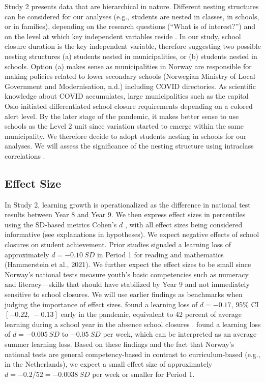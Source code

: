 Study 2 presents data that are hierarchical in nature. Different nesting structures can be considered for our analyses (e.g., students are nested in classes, in schools, or in families), depending on the research questions (``What is of interest?'') and on the level at which key independent variables reside \parencite{scott:2013}. In our study, school closure duration is the key independent variable, therefore suggesting two possible nesting structures (a) students nested in municipalities, or (b) students nested in schools. Option (a) makes sense as municipalities in Norway are responsible for making policies related to lower secondary schools (Norwegian Ministry of Local Government and Modernisation, n.d.) including COVID directories. As scientific knowledge about COVID accumulates, large municipalities such as the capital Oslo initiated differentiated school closure requirements depending on a colored alert level. By the later stage of the pandemic, it makes better sense to use schools as the Level 2 unit since variation started to emerge within the same municipality. We therefore decide to adopt students nesting in schools for our analyses. We will assess the significance of the nesting structure using intraclass correlations \parencite[$\text{ICC}_1$, ][]{ludtke:2009}.

\subsection{Effect Size}%

In Study 2, learning growth is operationalized as the difference in national test results between Year 8 and Year 9. We then express effect sizes in percentiles using the SD-based metrics Cohen's $d$ \parencite{cohen:1988}, with all effect sizes being considered informative (see explanations in hypotheses). We expect negative effects of school closures on student achievement. Prior studies signaled a learning loss of approximately $d=-0.10\ SD$ in Period 1 for reading and mathematics (Hammerstein et al., 2021). We further expect the effect sizes to be small since Norway's national tests measure youth's basic competencies such as numeracy and literacy—skills that should have stabilized by Year 9 and not immediately sensitive to school closures. We will use earlier findings as benchmarks when judging the importance of effect sizes. \textcite{betthauser:2022} found a learning loss of $d=-0.17$, 95\% CI $[-0.22,\ -0.13]$ early in the pandemic, equivalent to 42 percent of average learning during a school year in the absence school closures \parencite[teachers typically can attain between $d=0.20$ and $d=0.40$ per year; ][]{hattie:2009}. \textcite{hammerstein:2021} found a learning loss of $d=-0.005\ SD$ to $-0.05\ SD$ per week, which can be interpreted as an average summer learning loss. Based on these findings and the fact that Norway's national tests are general competency-based in contrast to curriculum-based (e.g., in the Netherlands), we expect a small effect size of approximately $d=-0.2/52=-0.0038\ SD$ per week or smaller for Period 1.

